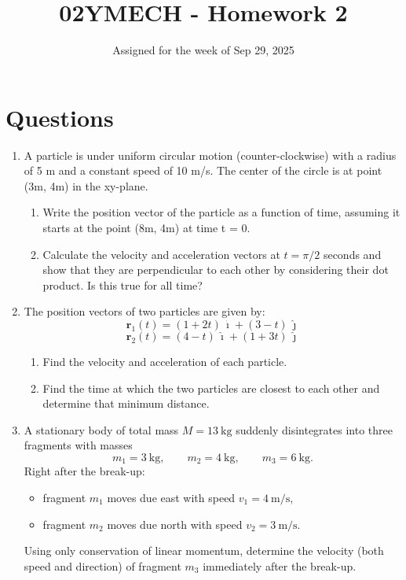 \documentclass[12pt]{article}
\title{02YMECH - Homework 2}
\date{Assigned for the week of Sep 29, 2025}
\author{}
\begin{document}
\maketitle

\section*{Questions}

\begin{enumerate}
    \item A particle is under uniform circular motion (counter-clockwise) with a radius of 5 m and a constant speed of 10 m/s. The center of the circle is at point (3m, 4m) in the xy-plane. 
    \begin{enumerate}
      \item Write the position vector of the particle as a function of time, assuming it starts at the point (8m, 4m) at time t = 0.
      \item Calculate the velocity and acceleration vectors at $t=\pi/2$ seconds and show that they are perpendicular to each other by considering their dot product. Is this true for all time?
    \end{enumerate}


    \item The position vectors of two particles are given by:
    \[\mathbf{r}_1(t) = (1 + 2t)\,\hat{\imath} + (3 - t)\,\hat{\jmath}\]
    \[\mathbf{r}_2(t) = (4 - t)\,\hat{\imath} + (1 + 3t)\,\hat{\jmath}\]
    \begin{enumerate}
        \item Find the velocity and acceleration of each particle.
        \item Find the time at which the two particles are closest to each other and determine that minimum distance.
    \end{enumerate}
    \item A stationary body of total mass $M = 13\ \text{kg}$ suddenly disintegrates into three fragments with masses
\[
m_1 = 3\ \text{kg}, \qquad m_2 = 4\ \text{kg}, \qquad m_3 = 6\ \text{kg}.
\]
Right after the break-up:
\begin{itemize}
    \item fragment $m_1$ moves due east with speed $v_1 = 4\ \text{m/s}$,
    \item fragment $m_2$ moves due north with speed $v_2 = 3\ \text{m/s}$.
\end{itemize}
Using only conservation of linear momentum, determine the velocity (both speed and direction) of fragment $m_3$ immediately after the break-up. 


\end{enumerate}
\end{document}

